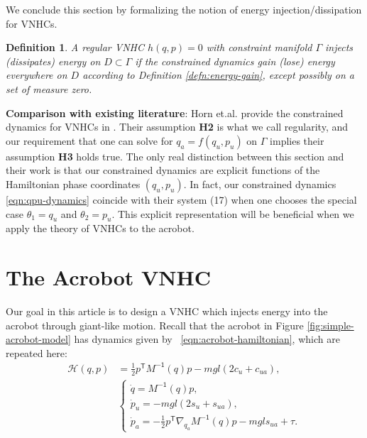 \documentclass[journal,twoside,web]{ieeecolor}
\newtheorem{defn}[thm]{Definition} %
\newcommand*{\tpose}{^\mathsf{T}}
\newcommand*{\Minv}{M^\mathsf{-1}}
\begin{document}
We conclude this section by formalizing the notion of energy
injection/dissipation for VNHCs.

\begin{defn}\label{defn:energy-injection}
    A regular VNHC \(h(q, p) = 0\) with constraint manifold \(\Gamma\)
    \textit{injects (dissipates) energy on \(D \subset \Gamma\)} if the
    constrained dynamics gain (lose) energy everywhere on \(D\) according to
    Definition \ref{defn:energy-gain}, except possibly on a set of measure
    zero.
\end{defn}

\textbf{Comparison with existing literature}: Horn et.al. provide the constrained
dynamics for VNHCs in \cite{nhvc_incline_walking}.
Their assumption \textbf{H2} is what we call regularity, and our requirement
that one can solve for \(q_a = f(q_u,p_u)\) on \(\Gamma\) implies their
assumption \textbf{H3} holds true.
The only real distinction between this section and their work
is that our constrained dynamics are explicit functions of the Hamiltonian phase
coordinates \((q_u,p_u)\).
In fact, our constrained dynamics \eqref{eqn:qpu-dynamics} coincide with their
system (17) when one chooses the special case \(\theta_1 = q_u\) and 
\(\theta_2 = p_u\).
This explicit representation will be beneficial when we apply the theory of
VNHCs to the acrobot.

\section{The Acrobot VNHC}\label{sec:acrobot}

Our goal in this article is to design a VNHC which injects energy into the
acrobot through giant-like motion.
Recall that the acrobot in Figure \ref{fig:simple-acrobot-model} has dynamics given by
~\eqref{eqn:acrobot-hamiltonian}, which are
repeated here:
\begin{align*}
    \mathcal{H}(q,p) &= \frac{1}{2}p\tpose \Minv(q) p -
    mgl\left(2 c_u + c_{ua}\right)
    , \\
     &\begin{cases}
        \dot{q} = \Minv(q) p 
        ,\\
        \dot{p}_u = -mgl\left(2s_u + s_{ua}\right) 
        ,\\
        \dot{p}_a =-\frac{1}{2}p\tpose \nabla_{q_a}\Minv(q) p
        - mgl s_{ua} + \tau.
    \end{cases}
\end{align*}
\end{document}
